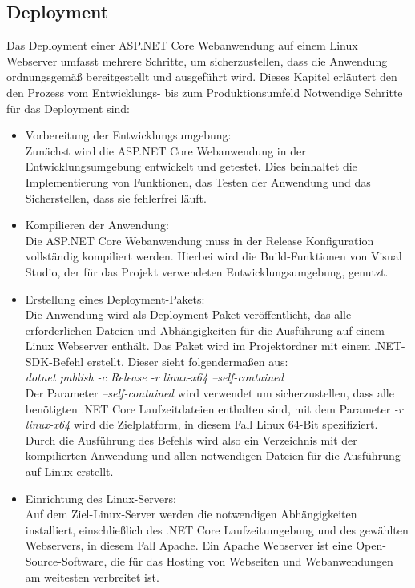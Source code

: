 \documentclass[conference]{IEEEtran}
\begin{document}
\subsection{Deployment}
Das Deployment einer ASP.NET Core Webanwendung auf einem Linux Webserver umfasst mehrere Schritte, um sicherzustellen, dass die Anwendung ordnungsgemäß bereitgestellt und ausgeführt wird. Dieses Kapitel erläutert den den Prozess vom Entwicklungs- bis zum Produktionsumfeld
Notwendige Schritte für das Deployment sind:
\begin{itemize}
	\item Vorbereitung der Entwicklungsumgebung: \\
	Zunächst wird die ASP.NET Core Webanwendung in der Entwicklungsumgebung entwickelt und getestet. Dies beinhaltet die Implementierung von Funktionen, das Testen der Anwendung und das Sicherstellen, dass sie fehlerfrei läuft.
	\item Kompilieren der Anwendung: \\
	Die ASP.NET Core Webanwendung muss in der Release Konfiguration vollständig kompiliert werden. Hierbei wird die Build-Funktionen von Visual Studio, der für das Projekt verwendeten Entwicklungsumgebung, genutzt.
	\item Erstellung eines Deployment-Pakets: \\
	Die Anwendung wird als Deployment-Paket veröffentlicht, das alle erforderlichen Dateien und Abhängigkeiten für die Ausführung auf einem Linux Webserver enthält. Das Paket wird im Projektordner mit einem .NET-SDK-Befehl erstellt. Dieser sieht folgendermaßen aus:\\
	\textit{dotnet publish -c Release -r linux-x64 --self-contained} \\
	Der Parameter \textit{--self-contained} wird verwendet um sicherzustellen, dass alle benötigten .NET Core Laufzeitdateien enthalten sind, mit dem Parameter \textit{-r linux-x64} wird die Zielplatform, in diesem Fall Linux 64-Bit spezifiziert. Durch die Ausführung des Befehls wird also ein Verzeichnis mit der kompilierten Anwendung und allen notwendigen Dateien für die Ausführung auf Linux erstellt.
	\item Einrichtung des Linux-Servers: \\
	Auf dem Ziel-Linux-Server werden die notwendigen Abhängigkeiten installiert, einschließlich des .NET Core Laufzeitumgebung und des gewählten Webservers, in diesem Fall Apache. Ein Apache Webserver ist eine Open-Source-Software, die für das Hosting von Webseiten und Webanwendungen am weitesten verbreitet ist. 

\end{itemize}
\end{document}
